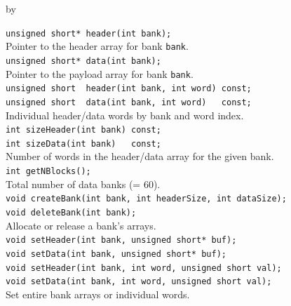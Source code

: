 \documentclass[twoside]{article}
\newcommand{\entrylabel}[1]{\mbox{\textbf{{#1}}}\hfil}%
\newenvironment{entry}
{\begin{list}{}%
    {\renewcommand{\makelabel}{\entrylabel}%
     \setlength{\labelwidth}{90pt}%
     \setlength{\leftmargin}{\labelwidth}
     \advance\leftmargin by \labelsep%
      }%
    }%
  {\end{list}}
\newcommand{\Entrylabel}[1]%
{\raisebox{0pt}[1ex][0pt]{\makebox[\labelwidth][l]%
    {\parbox[t]{\labelwidth}{\hspace{0pt}\textbf{{#1}}}}}}
\newenvironment{Entry}%
{\renewcommand{\entrylabel}{\Entrylabel}\begin{entry}}%
  {\end{entry}}
\begin{document}
\begin{Entry}
\item[Public Member\\ Functions]
    \verb+unsigned short* header(int bank);+\\
        Pointer to the header array for bank \verb+bank+.\\
    \verb+unsigned short* data(int bank);+\\
        Pointer to the payload array for bank \verb+bank+.\\
    \verb+unsigned short  header(int bank, int word) const;+\\
    \verb+unsigned short  data(int bank, int word)   const;+\\
        Individual header/data words by bank and word index.\\
    \verb+int sizeHeader(int bank) const;+\\
    \verb+int sizeData(int bank)   const;+\\
        Number of words in the header/data array for the given bank.\\
    \verb+int getNBlocks();+\\
        Total number of data banks (= 60).\\
    \verb+void createBank(int bank, int headerSize, int dataSize);+\\
    \verb+void deleteBank(int bank);+\\
        Allocate or release a bank's arrays.\\
    \verb+void setHeader(int bank, unsigned short* buf);+\\
    \verb+void setData(int bank, unsigned short* buf);+\\
    \verb+void setHeader(int bank, int word, unsigned short val);+\\
    \verb+void setData(int bank, int word, unsigned short val);+\\
        Set entire bank arrays or individual words.\\
\end{Entry}
\clearpage

\end{document}
